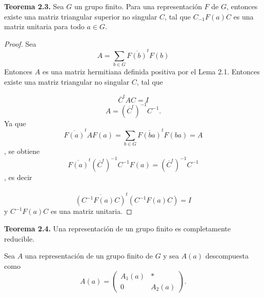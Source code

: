 \documentclass[12pt]{book}
\theoremstyle{definition}
\newcounter{in}
\newcounter{ini}
\begin{document}
\textbf{Teorema 2.3.} Sea $G$ un grupo finito. Para una representación
$F$ de $G$, entonces existe una matriz triangular superior no singular $C$, tal que
$C_{-1}F\left(a\right)C$ es una matriz unitaria para todo $a \in G$.
\begin{proof}
Sea
\begin{equation*}
A=\sum_{b \in G} \overline{F\left(b\right)}^{t}F\left(b\right)
\end{equation*}
Entonces $A$ es una matriz hermitiana definida positiva por el Lema
2.1. Entonces existe una matriz triangular no singular $C$, tal que

\begin{equation*}
  \overline{C}^{t}AC= I
\end{equation*}
\begin{equation*}
  A=(\overline{C}^{t})^{-1}C^{-1}.
\end{equation*}
Ya que
\begin{equation*}
\overline{F\left(a\right)}^{t}AF\left(a\right)=\sum_{b \in G} \overline{F\left(ba\right)}^{t}F\left(ba\right)=A
\end{equation*},
se obtiene
\begin{equation*}
\overline{F\left(a\right)}^{t}(\overline{C}^{t})^{-1}C^{-1}F\left(a\right)=(\overline{C}^{t})^{-1}C^{-1}
\end{equation*},
es decir\\~\\
\begin{equation*}
\overline{(C^{-1}F(a)C)}^{t}(C^{-1}F(a)C)=I
\end{equation*}
y $C^{-1}F(a)C$ es una matriz unitaria.
\end{proof}

\textbf{Teorema 2.4.} Una representación de un grupo finito es
completamente reducible.

Sea $A$ una representación de un grupo finito de $G$ y sea $A(a)$
descompuesta como
\begin{equation*}
  A(a)=
  \begin{pmatrix}
    A_{1}(a) & * \\ 
    0 & A_{2}(a)
  \end{pmatrix}.
\end{equation*}
\end{document}
